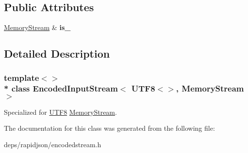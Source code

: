 \subsection*{Public Attributes}
\begin{DoxyCompactItemize}
\item 
\hyperlink{struct_memory_stream}{Memory\+Stream} \& {\bfseries is\+\_\+}\hypertarget{class_encoded_input_stream_3_01_u_t_f8_3_4_00_01_memory_stream_01_4_a37cf9cba16718cbc3a1bca57db37b41c}{}\label{class_encoded_input_stream_3_01_u_t_f8_3_4_00_01_memory_stream_01_4_a37cf9cba16718cbc3a1bca57db37b41c}

\end{DoxyCompactItemize}


\subsection{Detailed Description}
\subsubsection*{template$<$$>$\\*
class Encoded\+Input\+Stream$<$ U\+T\+F8$<$$>$, Memory\+Stream $>$}

Specialized for \hyperlink{struct_u_t_f8}{U\+T\+F8} \hyperlink{struct_memory_stream}{Memory\+Stream}. 

The documentation for this class was generated from the following file\+:\begin{DoxyCompactItemize}
\item 
deps/rapidjson/encodedstream.\+h\end{DoxyCompactItemize}
